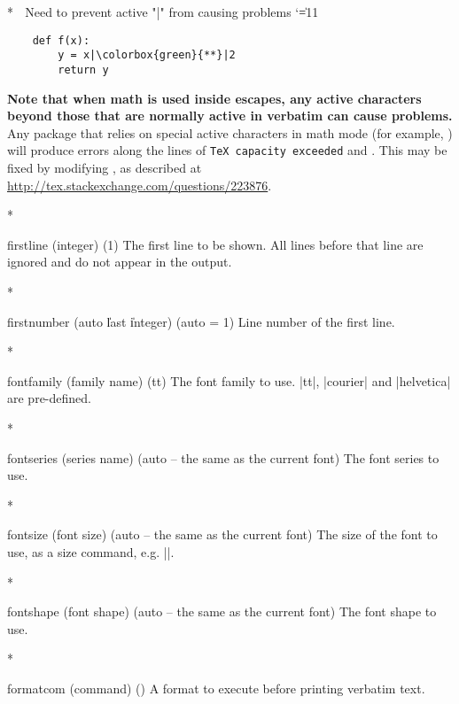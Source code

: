 \begin{paracol}{2}
\begin{optionlist}
\switchcolumn[0]*%
\begingroup  ^^A Need to prevent active "|" from causing problems
\catcode`\|=11
\begin{example}
    \begin{verbatim}
    def f(x):
        y = x|\colorbox{green}{**}|2
        return y
    \end{verbatim}
\end{example}
\endgroup

\textbf{Note that when math is used inside escapes, any active characters beyond those that are normally active in verbatim can cause problems.}  Any package that relies on special active characters in math mode (for example, ) will produce errors along the lines of \texttt{TeX capacity exceeded} and \texttt{\string\leavevmode \string\kern \string\z@}.  This may be fixed by modifying \texttt{\string\@noligs}, as described at \url{http://tex.stackexchange.com/questions/223876}.
\switchcolumn

\switchcolumn[0]*%
  \item[firstline (integer) (1)]
    The first line to be shown.
    All lines before that line are ignored and do not appear in the output.
    \switchcolumn

\switchcolumn[0]*%
  \item[firstnumber (auto \| last \| integer) (auto = 1)]
    Line number of the first line.
    \switchcolumn

\switchcolumn[0]*%
  \item[fontfamily (family name) (tt)]
    The font family to use.
    |tt|, |courier| and |helvetica| are pre-defined.
    \switchcolumn

\switchcolumn[0]*%
  \item[fontseries (series name) (auto \textrm{-- the same as the current font})]
    The font series to use.
    \switchcolumn

\switchcolumn[0]*%
  \item[fontsize (font size) (auto \textrm{-- the same as the current font})]
    The size of the font to use, as a size command, e.g. |\footnotesize|.
    \switchcolumn

\switchcolumn[0]*%
  \item[fontshape (font shape) (auto \textrm{-- the same as the current font})]
    The font shape to use.
    \switchcolumn

\switchcolumn[0]*%
  \item[formatcom (command) (\meta{none})]
    A format to execute before printing verbatim text.
    \switchcolumn


\end{optionlist}
\end{paracol}
